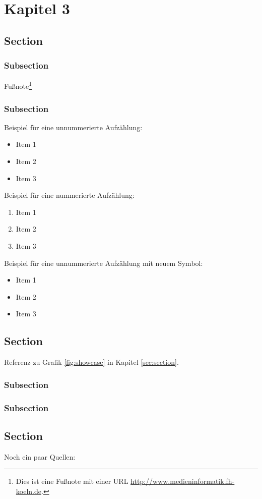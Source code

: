 \chapter{Kapitel 3}

\section{Section}

\subsection{Subsection}
Fußnote\footnote{Dies ist eine Fußnote mit einer URL \url{http://www.medieninformatik.fh-koeln.de}.}
  
\subsection{Subsection}
Beispiel für eine unnummerierte Aufzählung:
\begin{itemize}
	\item Item 1
	\item Item 2
	\item Item 3
\end{itemize}

\noindent{}Beispiel für eine nummerierte Aufzählung:
\begin{enumerate}
	\item Item 1
	\item Item 2
	\item Item 3
\end{enumerate}



\noindent{}Beispiel für eine unnummerierte Aufzählung mit neuem Symbol:
\begin{itemize}
\renewcommand{\labelitemi}{$\rightarrow$}
	\item Item 1
	\item Item 2
	\item Item 3
\end{itemize}

\section{Section}
Referenz zu Grafik \ref{fig:showcase} in Kapitel \ref{sec:section}.

\subsection{Subsection}

\subsection{Subsection}

\section{Section}
Noch ein paar Quellen: \cite{Alo06} \cite{Pre94} \cite{W3C04}